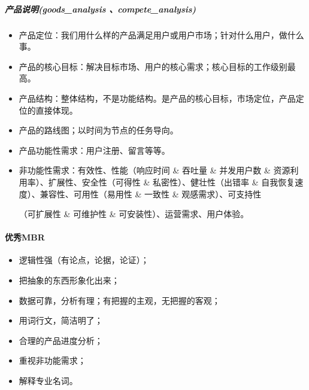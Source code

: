 \documentclass[letterpaper,10pt,english]{sphinxmanual}
\begin{document}
\subparagraph{产品说明(goods\_analysis 、compete\_analysis)}
\label{\detokenize{chapter_knowledge/MRD:goods-analysis-compete-analysis}}\begin{itemize}
\item {} 
产品定位：我们用什么样的产品满足用户或用户市场；针对什么用户，做什么事。

\item {} 
产品的核心目标：解决目标市场、用户的核心需求；核心目标的工作级别最高。

\item {} 
产品结构：整体结构，不是功能结构。是产品的核心目标，市场定位，产品定位的直接体现。

\item {} 
产品的路线图；以时间为节点的任务导向。

\item {} 
产品功能性需求：用户注册、留言等等。

\item {} 
非功能性需求：有效性、性能（响应时间 \& 吞吐量 \& 并发用户数 \&
资源利用率）、扩展性、安全性（可得性 \& 私密性）、健壮性（出错率 \&
自我恢复速度）、兼容性、可用性（易用性 \& 一致性 \&
观感需求）、可支持性%
\begin{footnote}[560]\sphinxAtStartFootnote
{}
%
\end{footnote}（可扩展性
\& 可维护性 \& 可安装性）、运营需求、用户体验。

\end{itemize}


\paragraph{优秀MBR}
\label{\detokenize{chapter_knowledge/MRD:mbr}}\begin{itemize}
\item {} 
逻辑性强（有论点，论据，论证）；

\item {} 
把抽象的东西形象化出来；

\item {} 
数据可靠，分析有理；有把握的主观，无把握的客观；

\item {} 
用词行文，简洁明了；

\item {} 
合理的产品进度分析；

\item {} 
重视非功能需求；

\item {} 
解释专业名词。

\end{itemize}
\end{document}
